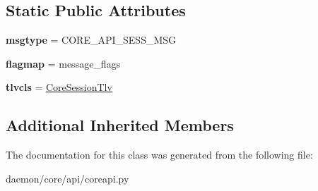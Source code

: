 \subsection*{Static Public Attributes}
\begin{DoxyCompactItemize}
\item 
\hypertarget{classcore_1_1api_1_1coreapi_1_1_core_session_message_abe109dd0f992be65c392daf46b8c1bc6}{{\bfseries msgtype} = C\+O\+R\+E\+\_\+\+A\+P\+I\+\_\+\+S\+E\+S\+S\+\_\+\+M\+S\+G}\label{classcore_1_1api_1_1coreapi_1_1_core_session_message_abe109dd0f992be65c392daf46b8c1bc6}

\item 
\hypertarget{classcore_1_1api_1_1coreapi_1_1_core_session_message_a585bf1c8ee794fb67c48b16690083f47}{{\bfseries flagmap} = message\+\_\+flags}\label{classcore_1_1api_1_1coreapi_1_1_core_session_message_a585bf1c8ee794fb67c48b16690083f47}

\item 
\hypertarget{classcore_1_1api_1_1coreapi_1_1_core_session_message_a55097d4f3b54d0c95fc7e4da1c6e2825}{{\bfseries tlvcls} = \hyperlink{classcore_1_1api_1_1coreapi_1_1_core_session_tlv}{Core\+Session\+Tlv}}\label{classcore_1_1api_1_1coreapi_1_1_core_session_message_a55097d4f3b54d0c95fc7e4da1c6e2825}

\end{DoxyCompactItemize}
\subsection*{Additional Inherited Members}


The documentation for this class was generated from the following file\+:\begin{DoxyCompactItemize}
\item 
daemon/core/api/coreapi.\+py\end{DoxyCompactItemize}
